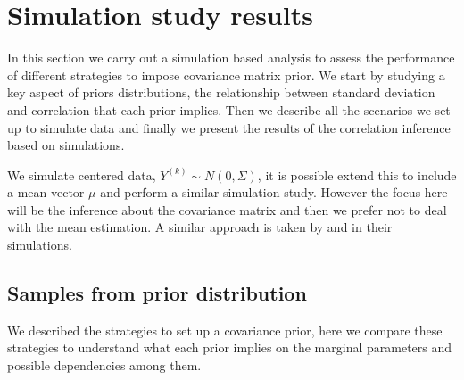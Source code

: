 \documentclass{article}
\begin{document}
\section{Simulation study results}

In this section we carry out a simulation based analysis to assess the performance of different strategies to impose covariance matrix prior. We start by studying a key aspect of priors distributions, the relationship between standard deviation and correlation that each prior implies. Then we describe all the scenarios we set up to simulate data and finally we present the results of the correlation inference based on simulations.  

We simulate centered data, $Y^{(k)}\sim N(0,\Sigma)$, it is possible extend this to include a mean vector $\mu$ and perform a similar simulation study. However the focus here will be the inference about the covariance matrix and then we prefer not to deal with the mean estimation. A similar approach is taken by  \cite{daniels1999} and \cite{matilde} in their simulations.


\subsection{Samples from  prior distribution} 
We described the strategies to set up a covariance prior, here we compare these strategies to understand what each prior implies on the marginal parameters and possible dependencies among them. 
\end{document}
